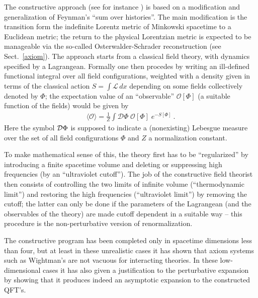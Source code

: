 \documentclass[multphys,vecphys]{svmult}
\newcommand{\bea}{\begin{eqnarray}}
\newcommand{\eea}{\end{eqnarray}}
\begin{document}
The constructive approach (see for instance
\cite {GJ}) is based on a modification and generalization of Feynman's
``sum over histories''. The main modification is the transition form
the indefinite Lorentz metric of Minkowski spacetime to a
Euclidean metric; the return to the physical  
Lorentzian metric is expected to be manageable via the so-called 
Osterwalder-Schrader reconstruction \cite{OS} (see Sect.~\ref{axiom}). 
The approach starts from a classical field theory, with dynamics 
specified by a Lagrangean. Formally one then procedes by writing an 
ill-defined functional integral over all
field configurations, weighted with a density given in terms of the
classical action $S=\int {\mathcal L} \,dx$ depending on some fields
collectively denoted by $\Phi$; the expectation value of an ``observable''
${\mathcal O}[\Phi]$ (a suitable function of the fields) would be given by
\bea
  \langle {\mathcal O}\rangle =\frac{1}{Z}\int {\mathcal D}\Phi\;
  {\mathcal O}[\Phi]\; e^{-S[\Phi]}\ .
\eea
Here the symbol ${\cal D}\Phi$ is supposed to indicate a (nonexisting) 
Lebesgue measure over the set of all field configurations $\Phi$ and $Z$ a 
normalization constant.

To make mathematical sense of this, the theory first has to be 
``regularized'' by introducing a finite spacetime volume and deleting or 
suppressing high frequencies (by an ``ultraviolet cutoff''). The job of the constructive field theorist
then consists of controlling the two limits of infinite volume
(``thermodynamic limit'') and restoring the high frequencies
(``ultraviolet limit'') by removing the cutoff; the latter can only be
done if the parameters of the Lagrangean (and the observables of the
theory) are made cutoff dependent in a suitable way -- this procedure
is the non-perturbative version of
renormalization. 

The constructive program has been completed
only in spacetime dimensions less than four,
but at least in these unrealistic cases it has shown that axiom
systems such as Wightman's are not vacuous
for interacting theories. In these low-dimensional cases it has also
given a justification to the perturbative
expansion by showing that it produces indeed an asymptotic expansion
to the constructed QFT's. 
\end{document}
